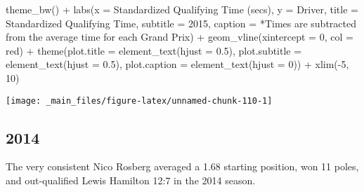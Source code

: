 \documentclass[
]{book}
\newenvironment{Shaded}{\begin{snugshade}}{\end{snugshade}}
\newcommand{\AttributeTok}[1]{\textcolor[rgb]{0.77,0.63,0.00}{#1}}
\newcommand{\DecValTok}[1]{\textcolor[rgb]{0.00,0.00,0.81}{#1}}
\newcommand{\FloatTok}[1]{\textcolor[rgb]{0.00,0.00,0.81}{#1}}
\newcommand{\FunctionTok}[1]{\textcolor[rgb]{0.00,0.00,0.00}{#1}}
\newcommand{\NormalTok}[1]{#1}
\newcommand{\SpecialCharTok}[1]{\textcolor[rgb]{0.00,0.00,0.00}{#1}}
\newcommand{\StringTok}[1]{\textcolor[rgb]{0.31,0.60,0.02}{#1}}
\begin{document}
\begin{Shaded}
\begin{Highlighting}[]
  \FunctionTok{theme\_bw}\NormalTok{() }\SpecialCharTok{+}
  \FunctionTok{labs}\NormalTok{(}\AttributeTok{x =} \StringTok{\textquotesingle{}Standardized Qualifying Time (secs)\textquotesingle{}}\NormalTok{,}
       \AttributeTok{y =} \StringTok{\textquotesingle{}Driver\textquotesingle{}}\NormalTok{,}
       \AttributeTok{title =} \StringTok{\textquotesingle{}Standardized Qualifying Time\textquotesingle{}}\NormalTok{,}
       \AttributeTok{subtitle =} \StringTok{\textquotesingle{}2015\textquotesingle{}}\NormalTok{,}
       \AttributeTok{caption =} \StringTok{\textquotesingle{}*Times are subtracted from the average time for each Grand Prix\textquotesingle{}}\NormalTok{) }\SpecialCharTok{+}
  \FunctionTok{geom\_vline}\NormalTok{(}\AttributeTok{xintercept =} \DecValTok{0}\NormalTok{, }\AttributeTok{col =} \StringTok{\textquotesingle{}red\textquotesingle{}}\NormalTok{) }\SpecialCharTok{+}
  \FunctionTok{theme}\NormalTok{(}\AttributeTok{plot.title =} \FunctionTok{element\_text}\NormalTok{(}\AttributeTok{hjust =} \FloatTok{0.5}\NormalTok{),}
        \AttributeTok{plot.subtitle =} \FunctionTok{element\_text}\NormalTok{(}\AttributeTok{hjust =} \FloatTok{0.5}\NormalTok{),}
        \AttributeTok{plot.caption =} \FunctionTok{element\_text}\NormalTok{(}\AttributeTok{hjust =} \DecValTok{0}\NormalTok{)) }\SpecialCharTok{+}
  \FunctionTok{xlim}\NormalTok{(}\SpecialCharTok{{-}}\DecValTok{5}\NormalTok{, }\DecValTok{10}\NormalTok{)}
\end{Highlighting}
\end{Shaded}

\begin{center}\texttt{[image: \_main\_files/figure-latex/unnamed-chunk-110-1]} \end{center}

\hypertarget{section-9}{%
\subsection{2014}\label{section-9}}

The very consistent Nico Rosberg averaged a 1.68 starting position, won 11 poles, and out-qualified Lewis Hamilton 12:7 in the 2014 season.
\end{document}
